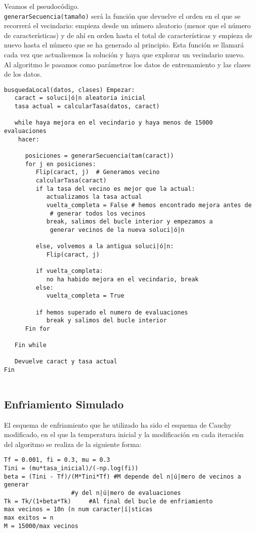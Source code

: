 \documentclass[12pt]{article}
\begin{document}
Veamos el pseudocódigo.\\
\texttt{generarSecuencia(tamaño)} será la función que devuelve el orden en el que se recorrerá el vecindario: empieza desde un número aleatorio (menor que el número de características) y de ahí en orden hasta el total de características y empieza de nuevo hasta el número que se ha generado al principio. Esta función se llamará cada vez que actualicemos la solución y haya que explorar un vecindario nuevo.\\
Al algoritmo le pasamos como parámetros los datos de entrenamiento y las clases de los datos.
\begin{lstlisting}
busquedaLocal(datos, clases) Empezar:
   caract = soluci|ó|n aleatoria inicial
   tasa actual = calcularTasa(datos, caract)
   
   while haya mejora en el vecindario y haya menos de 15000 evaluaciones
    hacer:
      
      posiciones = generarSecuencia(tam(caract))
      for j en posiciones:
         Flip(caract, j)  # Generamos vecino
         calcularTasa(caract)
         if la tasa del vecino es mejor que la actual:
            actualizamos la tasa actual
            vuelta_completa = False # hemos encontrado mejora antes de
             # generar todos los vecinos
            break, salimos del bucle interior y empezamos a 
             generar vecinos de la nueva soluci|ó|n
         
         else, volvemos a la antigua soluci|ó|n:
            Flip(caract, j)
            
         if vuelta_completa:
            no ha habido mejora en el vecindario, break
         else:
            vuelta_completa = True
         
         if hemos superado el numero de evaluaciones
            break y salimos del bucle interior
      Fin for
   
   Fin while
   
   Devuelve caract y tasa actual
Fin
   
\end{lstlisting}

\subsection{Enfriamiento Simulado}
El esquema de enfriamiento que he utilizado ha sido el esquema de Cauchy modificado, en el que la temperatura inicial y la modificación en cada iteración del algoritmo se realiza de la siguiente forma:
\begin{lstlisting}
Tf = 0.001, fi = 0.3, mu = 0.3
Tini = (mu*tasa_inicial)/(-np.log(fi))
beta = (Tini - Tf)/(M*Tini*Tf) #M depende del n|ú|mero de vecinos a generar 
   			       #y del n|ú|mero de evaluaciones
Tk = Tk/(1+beta*Tk) 	#Al final del bucle de enfriamiento
max vecinos = 10n (n num caracter|í|sticas
max exitos = n
M = 15000/max vecinos
\end{lstlisting}
\end{document}
